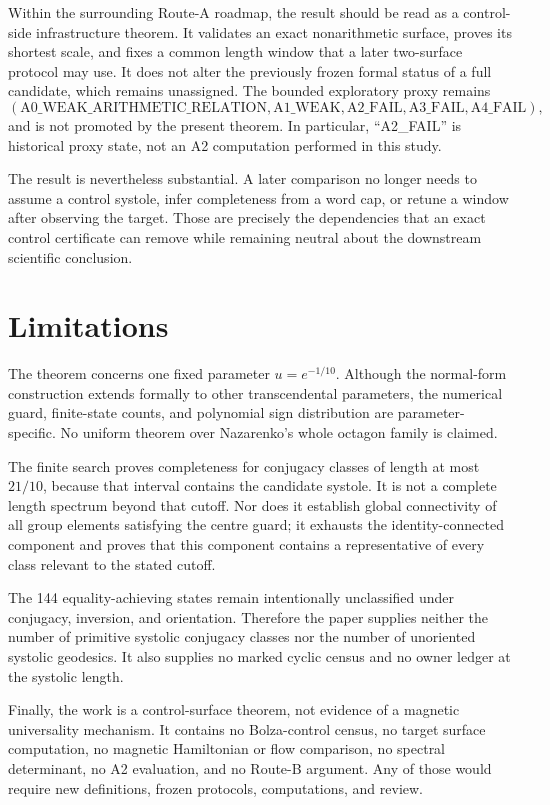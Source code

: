 \documentclass[11pt,a4paper]{article}
\theoremstyle{definition}
\begin{document}
Within the surrounding Route-A roadmap, the result should be read as a
control-side infrastructure theorem.  It validates an exact nonarithmetic
surface, proves its shortest scale, and fixes a common length window that a
later two-surface protocol may use.  It does not alter the previously frozen
formal status of a full candidate, which remains unassigned.  The bounded
exploratory proxy remains
\[
 (\mathrm{A0\_WEAK\_ARITHMETIC\_RELATION},
  \mathrm{A1\_WEAK},
  \mathrm{A2\_FAIL},
  \mathrm{A3\_FAIL},
  \mathrm{A4\_FAIL}),
\]
and is not promoted by the present theorem.  In particular, ``A2\_FAIL'' is
historical proxy state, not an A2 computation performed in this study.

The result is nevertheless substantial.  A later comparison no longer needs
to assume a control systole, infer completeness from a word cap, or retune a
window after observing the target.  Those are precisely the dependencies that
an exact control certificate can remove while remaining neutral about the
downstream scientific conclusion.

\section{Limitations}

The theorem concerns one fixed parameter \(u=e^{-1/10}\).  Although the
normal-form construction extends formally to other transcendental
parameters, the numerical guard, finite-state counts, and polynomial sign
distribution are parameter-specific.  No uniform theorem over Nazarenko's
whole octagon family is claimed.

The finite search proves completeness for conjugacy classes of length at most
\(21/10\), because that interval contains the candidate systole.  It is not a
complete length spectrum beyond that cutoff.  Nor does it establish global
connectivity of all group elements satisfying the centre guard; it exhausts
the identity-connected component and proves that this component contains a
representative of every class relevant to the stated cutoff.

The 144 equality-achieving states remain intentionally unclassified under
conjugacy, inversion, and orientation.  Therefore the paper supplies neither
the number of primitive systolic conjugacy classes nor the number of
unoriented systolic geodesics.  It also supplies no marked cyclic census and
no owner ledger at the systolic length.

Finally, the work is a control-surface theorem, not evidence of a magnetic
universality mechanism.  It contains no Bolza-control census, no target
surface computation, no magnetic Hamiltonian or flow comparison, no spectral
determinant, no A2 evaluation, and no Route-B argument.  Any of those would
require new definitions, frozen protocols, computations, and review.
\end{document}
